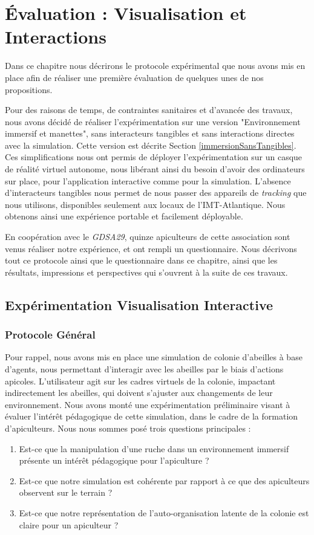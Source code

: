 \chapter{Évaluation : Visualisation et Interactions}

	Dans ce chapitre nous décrirons le protocole expérimental que nous avons mis en place afin de réaliser une première évaluation de quelques unes de nos propositions.
	
	Pour des raisons de temps, de contraintes sanitaires et d'avancée des travaux, nous avons décidé de réaliser l'expérimentation sur une version "Environnement immersif et manettes", sans interacteurs tangibles et sans interactions directes avec la simulation. Cette version est décrite Section \ref{immersionSansTangibles}. Ces simplifications nous ont permis de déployer l'expérimentation sur un casque de réalité virtuel autonome, nous libérant ainsi du besoin d'avoir des ordinateurs sur place, pour l'application interactive comme pour la simulation. L'absence d'interacteurs tangibles nous permet de nous passer des appareils de \textit{tracking} que nous utilisons, disponibles seulement aux locaux de l'IMT-Atlantique. Nous obtenons ainsi une expérience portable et facilement déployable.
	
	En coopération avec le \textit{GDSA29}, quinze apiculteurs de cette association sont venus réaliser notre expérience, et ont rempli un questionnaire. Nous décrivons tout ce protocole ainsi que le questionnaire dans ce chapitre, ainsi que les résultats, impressions et perspectives qui s'ouvrent à la suite de ces travaux.

	\section{Expérimentation Visualisation Interactive}
		\label{sectionExpe}
		
		\subsection{Protocole Général}
		\label{protocoleGeneral}
		Pour rappel, nous avons mis en place une simulation de colonie d'abeilles à base d'agents, nous permettant d'interagir avec les abeilles par le biais d'actions apicoles. L'utilisateur agit sur les cadres virtuels de la colonie, impactant indirectement les abeilles, qui doivent s'ajuster aux changements de leur environnement. Nous avons monté une expérimentation préliminaire visant à évaluer l'intérêt pédagogique de cette simulation, dans le cadre de la formation d'apiculteurs. Nous nous sommes posé trois questions principales :
		\begin{enumerate}
			\item Est-ce que la manipulation d'une ruche dans un environnement immersif présente un intérêt pédagogique pour l'apiculture ?
			\item Est-ce que notre simulation est cohérente par rapport à ce que des apiculteurs observent sur le terrain ?
			\item Est-ce que notre représentation de l'auto-organisation latente de la colonie est claire pour un apiculteur ?
		\end{enumerate}

